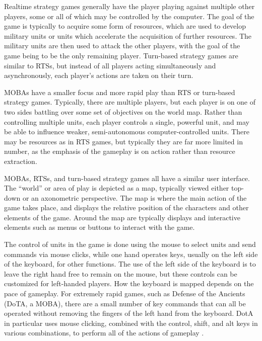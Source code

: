 Realtime strategy games generally have the player playing against multiple other players, some or all of which may be controlled by the computer. 
The goal of the game is typically to acquire some form of resources, which are used to develop military units or units which accelerate the acquisition of further resources. 
The military units are then used to attack the other players, with the goal of the game being to be the only remaining player. 
Turn-based strategy games are similar to RTSs, but instead of all players acting simultaneously and asynchronously, each player's actions are taken on their turn. 

MOBAs have a smaller focus and more rapid play than RTS or turn-based strategy games. 
Typically, there are multiple players, but each player is on one of two sides battling over some set of objectives on the world map. 
Rather than controlling multiple units, each player controls a single, powerful unit, and may be able to influence weaker, semi-autonomous computer-controlled units.  There may be resources as in RTS games, but typically they are far more limited in number, as the emphasis of the gameplay is on action rather than resource extraction.   

MOBAs, RTSs, and turn-based strategy games all have a similar user interface. 
The ``world'' or area of play is depicted as a map, typically viewed either top-down or an axonometric perspective. 
The map is where the main action of the game takes place, and displays the relative position of the characters and other elements of the game. 
Around the map are typically displays and interactive elements such as menus or buttons to interact with the game. 

The control of units in the game is done using the mouse to select units and send commands via mouse clicks, while one hand operates keys, usually on the left side of the keyboard, for other functions. 
The use of the left side of the keyboard is to leave the right hand free to remain on the mouse, but these controls can be customized for left-handed players. 
How the keyboard is mapped depends on the pace of gameplay. 
For extremely rapid games, such as Defense of the Ancients (DoTA, a MOBA), there are a small number of key commands that can all be operated without removing the fingers of the left hand from the keyboard. 
DotA in particular uses mouse clicking, combined with the control, shift, and alt keys in various combinations, to perform all of the actions of gameplay \citep{DOTAControls}.

